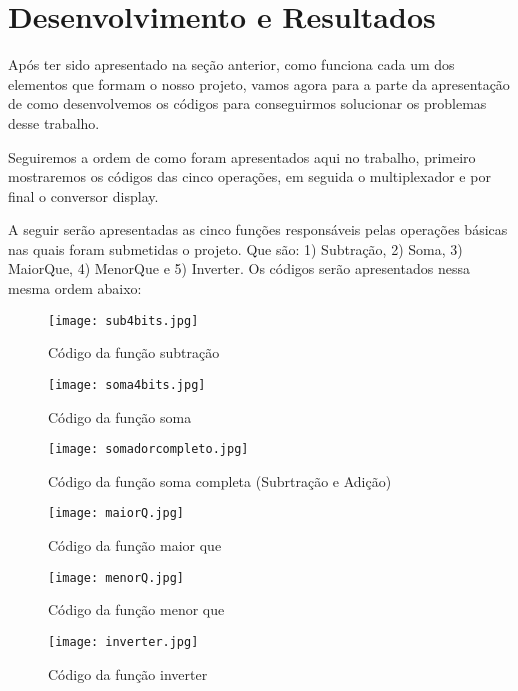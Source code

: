 \documentclass[
	12pt,				%
	openright,			%
	oneside,			%
	a4paper,			%
	brazil,				%
	]{abntex2}
\begin{document}
\chapter{Desenvolvimento e Resultados}

Após ter sido apresentado na seção anterior, como funciona cada um dos elementos que formam o nosso projeto, vamos agora para a parte da apresentação de como desenvolvemos os códigos para conseguirmos solucionar os problemas desse trabalho.

Seguiremos a ordem de como foram apresentados aqui no trabalho, primeiro mostraremos os códigos das cinco operações, em seguida o multiplexador e por final o conversor display.

A seguir serão apresentadas as cinco funções responsáveis pelas operações básicas nas quais foram submetidas o projeto. Que são:
1) Subtração, 2) Soma, 3) MaiorQue, 4) MenorQue e 5) Inverter. Os códigos serão apresentados nessa mesma ordem abaixo:

 
 
        \begin{figure}[h!]
        \centering
        \texttt{[image: sub4bits.jpg]}
        \caption{Código da função subtração}
        \end{figure}
        
        \begin{figure}[h!]
        \centering
        \texttt{[image: soma4bits.jpg]}
        \caption{Código da função soma}
        \end{figure}
        
        \begin{figure}[h!]
        \centering
        \texttt{[image: somadorcompleto.jpg]}
        \caption{Código da função soma completa (Subrtração e Adição)}
        \end{figure}
        
        \begin{figure}[h!]
        \centering
        \texttt{[image: maiorQ.jpg]}
        \caption{Código da função maior que}
        \end{figure}

        \begin{figure}[h!]
        \centering
        \texttt{[image: menorQ.jpg]}
        \caption{Código da função menor que}
        \end{figure}

        \begin{figure}[h!]
        \centering
        \texttt{[image: inverter.jpg]}
        \caption{Código da função inverter}
        \end{figure}
\end{document}

